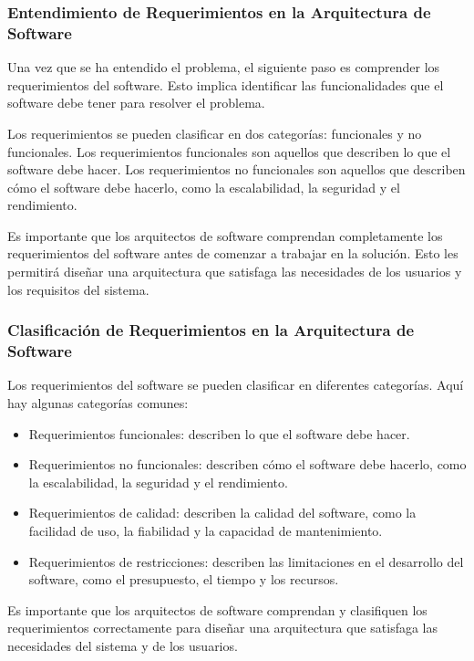 \documentclass[executivepaper]{article}
\begin{document}
\subsubsection*{Entendimiento de Requerimientos en la Arquitectura de Software}

Una vez que se ha entendido el problema, el siguiente paso es comprender los requerimientos del software. Esto implica identificar las funcionalidades que el software debe tener para resolver el problema.

Los requerimientos se pueden clasificar en dos categorías: funcionales y no funcionales. Los requerimientos funcionales son aquellos que describen lo que el software debe hacer. Los requerimientos no funcionales son aquellos que describen cómo el software debe hacerlo, como la escalabilidad, la seguridad y el rendimiento.

Es importante que los arquitectos de software comprendan completamente los requerimientos del software antes de comenzar a trabajar en la solución. Esto les permitirá diseñar una arquitectura que satisfaga las necesidades de los usuarios y los requisitos del sistema.

\subsubsection*{Clasificación de Requerimientos en la Arquitectura de Software}

Los requerimientos del software se pueden clasificar en diferentes categorías. Aquí hay algunas categorías comunes:

\begin{itemize}
\item Requerimientos funcionales: describen lo que el software debe hacer.
\item Requerimientos no funcionales: describen cómo el software debe hacerlo, como la escalabilidad, la seguridad y el rendimiento.
\item Requerimientos de calidad: describen la calidad del software, como la facilidad de uso, la fiabilidad y la capacidad de mantenimiento.
\item Requerimientos de restricciones: describen las limitaciones en el desarrollo del software, como el presupuesto, el tiempo y los recursos.
\end{itemize}

Es importante que los arquitectos de software comprendan y clasifiquen los requerimientos correctamente para diseñar una arquitectura que satisfaga las necesidades del sistema y de los usuarios.
\end{document}
